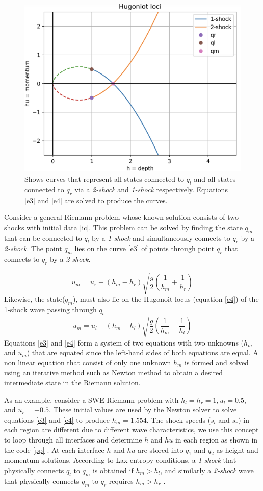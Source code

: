 \documentclass[12pt,a4paper]{article}
\begin{document}
	\begin{figure}[H]
		\centering
		\includegraphics[width=0.5\linewidth]{images/hl}
		\caption{Shows curves that represent all states connected to $q_l$ and all states connected to $q_r$ via a {\em 2-shock} and {\em 1-shock} respectively.  Equations \eqref{e3} and \eqref{e4} are solved to produce the curves.}
		\label{fig:hl}
	\end{figure}

	Consider a general Riemann problem whose known solution consists of two shocks with initial data \eqref{ic}. This problem can be solved by finding the state $q_m$ that can be connected to $q_l$ by a {\em 1-shock} and simultaneously connects to $q_r$ by a {\em 2-shock}. The point $q_m$ lies on the  curve \eqref{e3} of points  through  point $q_r$  that connects to $q_r$ by a {\em 2-shock}.

	\begin{equation}
		u_{m} = u_{r} + (h_{m} - h_{r})\sqrt{\frac{g}{2}\left(\frac{1}{h_m} + \frac{1}{h_r} \right)}
		\label{e3}
	\end{equation}
	Likewise, the state($q_m$), must also lie on the Hugonoit locus (equation \eqref{e4}) of the 1-shock wave passing through $q_l$
	\begin{equation}
		u_{m} = u_{l} - (h_{m} - h_{l})\sqrt{\frac{g}{2}\left(\frac{1}{h_m} + \frac{1}{h_l} \right)}
		\label{e4}
	\end{equation}
	Equations \eqref{e3} and \eqref{e4} form a system of two equations with two unknowns ($h_m$ and $u_m$) that are equated since the left-hand sides of both equations are equal. A non linear equation that consist of only one unknown $h_m$ is formed and solved using an iterative method such as Newton method to obtain a desired intermediate state in the Riemann solution.

   As an example, consider a SWE Riemann problem with $h_l = h_r = 1, u_l = 0.5, $ and $u_r = -0.5$. These initial values are used by the Newton solver to solve equations \eqref{e3} and \eqref{e4} to produce $h_{m} = 1.554$. The shock speeds ($s_l$ and $s_r$) in each region are different due to different wave characteristics, we use this concept to loop through all interfaces and determine $h$ and $hu$ in each region as shown in the code \ref{pp} . At each interface $h$ and $hu$ are stored into $q_1$ and $q_2$ as height and momentum solutions. According to Lax entropy conditions, a  {\em 1-shock} that physically connects $q_l$ to $q_m$ is obtained if $h_m>h_l$, and similarly a {\em 2-shock} wave that physically connects $q_m$ to $q_r$ requires $h_m>h_r$ \cite{le-ge-be:2011}.
   
\end{document}
